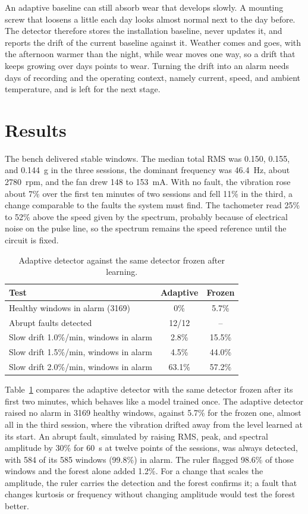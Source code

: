 \documentclass[english,hidelinks]{sbrt}
\begin{document}
An adaptive baseline can still absorb wear that develops slowly. A mounting screw that loosens a little each day looks almost normal next to the day before. The detector therefore stores the installation baseline, never updates it, and reports the drift of the current baseline against it. Weather comes and goes, with the afternoon warmer than the night, while wear moves one way, so a drift that keeps growing over days points to wear. Turning the drift into an alarm needs days of recording and the operating context, namely current, speed, and ambient temperature, and is left for the next stage.

\section{Results}
\label{sec:results}

The bench delivered stable windows. The median total RMS was 0.150, 0.155, and 0.144~g in the three sessions, the dominant frequency was 46.4~Hz, about 2780~rpm, and the fan drew 148 to 153~mA. With no fault, the vibration rose about 7\% over the first ten minutes of two sessions and fell 11\% in the third, a change comparable to the faults the system must find. The tachometer read 25\% to 52\% above the speed given by the spectrum, probably because of electrical noise on the pulse line, so the spectrum remains the speed reference until the circuit is fixed.

\begin{table}[t]
\caption{Adaptive detector against the same detector frozen after learning.}
\label{tab:results}
\centering
\begin{tabular}{lcc}
\hline
Test & Adaptive & Frozen \\
\hline
Healthy windows in alarm (3169) & 0\% & 5.7\% \\
Abrupt faults detected & 12/12 & -- \\
Slow drift 1.0\%/min, windows in alarm & 2.8\% & 15.5\% \\
Slow drift 1.5\%/min, windows in alarm & 4.5\% & 44.0\% \\
Slow drift 2.0\%/min, windows in alarm & 63.1\% & 57.2\% \\
\hline
\end{tabular}
\end{table}

Table~\ref{tab:results} compares the adaptive detector with the same detector frozen after its first two minutes, which behaves like a model trained once. The adaptive detector raised no alarm in 3169 healthy windows, against 5.7\% for the frozen one, almost all in the third session, where the vibration drifted away from the level learned at its start. An abrupt fault, simulated by raising RMS, peak, and spectral amplitude by 30\% for 60~s at twelve points of the sessions, was always detected, with 584 of its 585 windows (99.8\%) in alarm. The ruler flagged 98.6\% of those windows and the forest alone added 1.2\%. For a change that scales the amplitude, the ruler carries the detection and the forest confirms it; a fault that changes kurtosis or frequency without changing amplitude would test the forest better.
\end{document}
